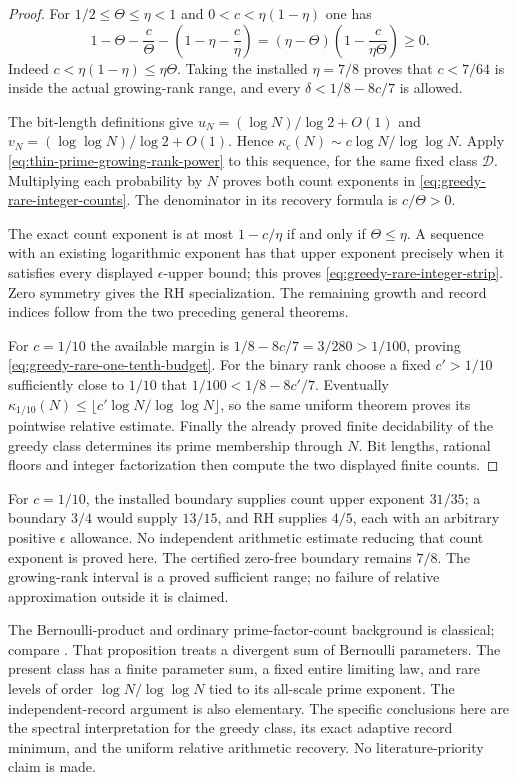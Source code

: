 \documentclass[11pt]{article}
\theoremstyle{definition}
\begin{document}
\begin{proof}
For $1/2\le\Theta\le\eta<1$ and
$0<c<\eta(1-\eta)$ one has
\[
 1-\Theta-\frac c\Theta
  -\left(1-\eta-\frac c\eta\right)
       =(\eta-\Theta)\left(1-\frac c{\eta\Theta}\right)
       \ge0.
\]
Indeed $c<\eta(1-\eta)\le\eta\Theta$.
Taking the installed $\eta=7/8$ proves that
$c<7/64$ is inside the actual growing-rank range, and
every $\delta<1/8-8c/7$ is allowed.

The bit-length definitions give
$u_N=(\log N)/\log2+O(1)$ and
$v_N=(\log\log N)/\log2+O(1)$.
Hence
$\kappa_c(N)\sim c\log N/\log\log N$.
Apply \eqref{eq:thin-prime-growing-rank-power} to this
sequence, for the same fixed class $\mathcal D$.
Multiplying each probability by $N$ proves both count
exponents in \eqref{eq:greedy-rare-integer-counts}.
The denominator in its recovery formula is $c/\Theta>0$.

The exact count exponent is at most $1-c/\eta$ if and
only if $\Theta\le\eta$.
A sequence with an existing logarithmic exponent has that
upper exponent precisely when it satisfies every displayed
$\epsilon$-upper bound; this proves
\eqref{eq:greedy-rare-integer-strip}.
Zero symmetry gives the RH specialization.
The remaining growth and record indices follow from the
two preceding general theorems.

For $c=1/10$ the available margin is
$1/8-8c/7=3/280>1/100$, proving
\eqref{eq:greedy-rare-one-tenth-budget}.
For the binary rank choose a fixed $c'>1/10$ sufficiently
close to $1/10$ that
$1/100<1/8-8c'/7$.
Eventually
$\kappa_{1/10}(N)\le
 \lfloor c'\log N/\log\log N\rfloor$,
so the same uniform theorem proves its pointwise relative
estimate.
Finally the already proved finite decidability of the
greedy class determines its prime membership through $N$.
Bit lengths, rational floors and integer factorization
then compute the two displayed finite counts.
\end{proof}

For $c=1/10$, the installed boundary supplies count upper
exponent $31/35$; a boundary $3/4$ would supply $13/15$,
and RH supplies $4/5$, each with an arbitrary positive
$\epsilon$ allowance.
No independent arithmetic estimate reducing that count
exponent is proved here.  The certified zero-free boundary
remains $7/8$.
The growing-rank interval is a proved sufficient range;
no failure of relative approximation outside it is claimed.

The Bernoulli-product and ordinary prime-factor-count
background is classical; compare
\cite[Proposition~3.1 and \S4]{KN}.
That proposition treats a divergent sum of Bernoulli
parameters.  The present class has a finite parameter sum,
a fixed entire limiting law, and rare levels of order
$\log N/\log\log N$ tied to its all-scale prime exponent.
The independent-record argument is also elementary.
The specific conclusions here are the spectral
interpretation for the greedy class, its exact adaptive
record minimum, and the uniform relative arithmetic
recovery.  No literature-priority claim is made.
\end{document}
